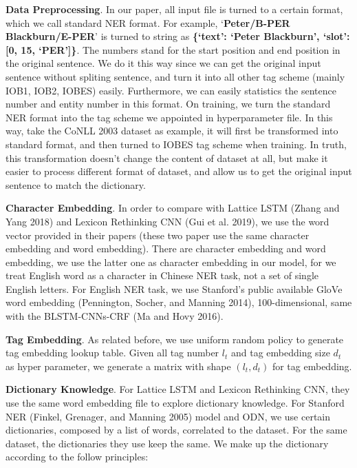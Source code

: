 \documentclass[letterpaper]{article} %
\begin{document}
\textbf{Data Preprocessing}. In our paper, all input file is turned to a certain format, which we call standard NER format. For example, `\textbf{Peter/B-PER Blackburn/E-PER}' is turned to string as \textbf{\{`text': `Peter Blackburn', `slot': [0, 15, `PER']\}}. The numbers stand for the start position and end position in the original sentence. We do it this way since we can get the original input sentence without spliting sentence, and turn it into all other tag scheme (mainly IOB1, IOB2, IOBES) easily. Furthermore, we can easily statistics the sentence number and entity number in this format. On training, we turn the standard NER format into the tag scheme we appointed in hyperparameter file. In this way, take the CoNLL 2003 dataset as example, it will first be transformed into standard format, and then turned to IOBES tag scheme when training. In truth, this transformation doesn't change the content of dataset at all, but make it easier to process different format of dataset, and allow us to get the original input sentence to match the dictionary.

\textbf{Character Embedding}. In order to compare with Lattice LSTM (Zhang and Yang 2018) and Lexicon Rethinking CNN (Gui et al. 2019), we use the word vector provided in their papers (these two paper use the same character embedding and word embedding). There are character embedding and word embedding, we use the latter one as character embedding in our model, for we treat English word as a character in Chinese NER task, not a set of single English letters. For English NER task, we use Stanford's public available GloVe word embedding (Pennington, Socher, and Manning 2014), 100-dimensional, same with the BLSTM-CNNs-CRF (Ma and Hovy 2016).

\textbf{Tag Embedding}. As related before, we use uniform random policy to generate tag embedding lookup table. Given all tag number $l_t$ and tag embedding size $d_t$ as hyper parameter, we generate a matrix with shape $(l_t, d_t)$ for tag embedding.

\textbf{Dictionary Knowledge}. For Lattice LSTM and Lexicon Rethinking CNN, they use the same word embedding file to explore dictionary knowledge. For Stanford NER (Finkel, Grenager, and Manning 2005) model and ODN, we use certain dictionaries, composed by a list of words, correlated to the dataset. For the same dataset, the dictionaries they use keep the same. We make up the dictionary according to the follow principles:
\end{document}
